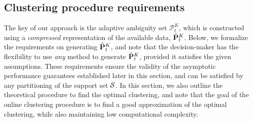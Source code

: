 \subsection{Clustering procedure requirements}
\label{sec:shared_cluster}
The key of our approach is the adaptive ambiguity set $\mathcal{P}^K_t$, which is constructed using a {\it compressed} representation of the available data, $\hat{{\mathbf P}}^K_t$.
Below, we formalize the requirements on generating $\hat{{\mathbf P}}^K_t$, and note that the decision-maker has the flexibility to use {\it any} method to generate $\hat{{\mathbf P}}^K_t$, provided it satisfies the given assumptions.
These requirements ensure the validity of the asymptotic performance guarantees established later in this section, and can be satisfied by any partitioning of the support set $\mathcal{S}$.
In this section, we also outline the theoretical procedure to find the optimal clustering, and note that the goal of the online clustering procedure is to find a good approximation of the optimal clustering, while also maintaining low computational complexity.





